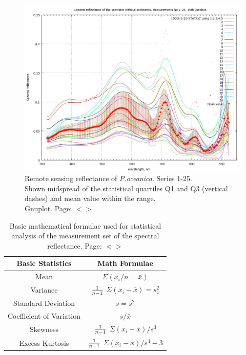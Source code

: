 \documentclass[11pt]{article}
\begin{document}
\begin{appendices}
\begin{figure}[H]
	\begin{center}
		\includegraphics[scale=0.35]{GNU-12.jpg}
		\caption{Remote sensing reflectance of \textit{P.oceanica}. Series 1-25. \\Shown midspread of the statistical quartiles Q1 and Q3 (vertical dashes) and mean value within the range. \\ \href{http://www.gnuplot.info/}{Gnuplot}­. Page: $<$\pageref{page-21}$>$}
		\label{fig:A.26}
	\end{center}
\end{figure}
\begin{table}[htbp]
	\caption{Basic mathematical formulae used for statistical analysis of the measurement set of the spectral reflectance. Page: $<$\pageref{page-41}$>$}
	\label{tab:13}
	\begin{center}
	\begin{tabular}{|c|c|}
		\hline\hline
		Basic Statistics & Math Formulae \\ \hline\hline
		\hline
		
		\vspace{1ex}

		Mean & $\Sigma(x_i/n=\bar x)$ \\ \hline
		Variance & $1 \over n-1$ $\Sigma(x_i-\bar x)=s^2_x$  \\ \hline
		Standard Deviation & $s=s^2$ \\ \hline
		Coefficient of Variation & $s/\bar x$ \\ \hline
		Skewness & $1 \over n-1$ $\Sigma(x_i-\bar x)/s^3$  \\ \hline
		Excess Kurtosis & $1 \over n-1$ $\Sigma(x_i-\bar x)/s^4-3$  \\ \hline
	\end{tabular}
	\end{center}
	\label{tab:19}
\end{table}


\end{appendices}
\end{document}
